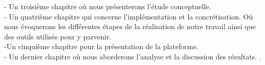-	Un troisième chapitre où nous présenterons l'étude conceptuelle.\\
-	Un quatrième chapitre qui concerne l’implémentation et la concrétisation. Où nous évoquerons les différentes étapes de la réalisation de notre travail ainsi que des outils utilisés pour y parvenir.\\
-Un cinquième chapitre pour la présentation de la plateforme.\\
-	Un dernier chapitre où nous aborderons l’analyse et la discussion des résultats.
.\par

